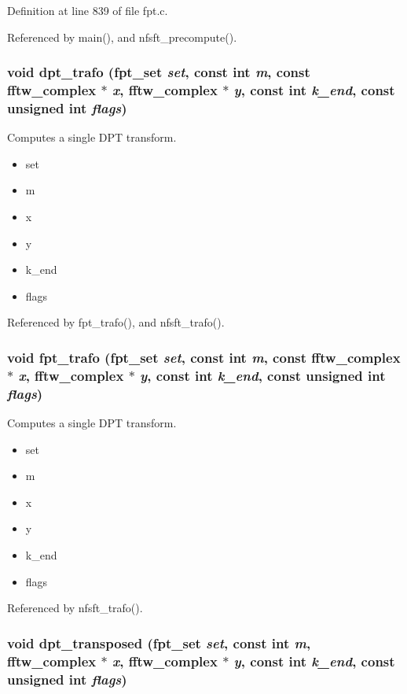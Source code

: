 Definition at line 839 of file fpt.c.

Referenced by main(), and nfsft\_\-precompute().\hypertarget{group__fpt_g213c59e560060e8b2f16958cda5f2bdb}{
\subsubsection{\setlength{\rightskip}{0pt plus 5cm}void dpt\_\-trafo ({\bf fpt\_\-set} {\em set}, const int {\em m}, const fftw\_\-complex $\ast$ {\em x}, fftw\_\-complex $\ast$ {\em y}, const int {\em k\_\-end}, const unsigned int {\em flags})}}
\label{group__fpt_g213c59e560060e8b2f16958cda5f2bdb}


Computes a single DPT transform. 

\begin{itemize}
\item set \item m \item x \item y \item k\_\-end \item flags \end{itemize}


Referenced by fpt\_\-trafo(), and nfsft\_\-trafo().\hypertarget{group__fpt_g16d416e80a919ac119d5cea13fce79d0}{
\subsubsection{\setlength{\rightskip}{0pt plus 5cm}void fpt\_\-trafo ({\bf fpt\_\-set} {\em set}, const int {\em m}, const fftw\_\-complex $\ast$ {\em x}, fftw\_\-complex $\ast$ {\em y}, const int {\em k\_\-end}, const unsigned int {\em flags})}}
\label{group__fpt_g16d416e80a919ac119d5cea13fce79d0}


Computes a single DPT transform. 

\begin{itemize}
\item set \item m \item x \item y \item k\_\-end \item flags \end{itemize}


Referenced by nfsft\_\-trafo().\hypertarget{group__fpt_g6681dc8303d72562d459a25b87deb357}{
\subsubsection{\setlength{\rightskip}{0pt plus 5cm}void dpt\_\-transposed ({\bf fpt\_\-set} {\em set}, const int {\em m}, fftw\_\-complex $\ast$ {\em x}, fftw\_\-complex $\ast$ {\em y}, const int {\em k\_\-end}, const unsigned int {\em flags})}}
\label{group__fpt_g6681dc8303d72562d459a25b87deb357}


